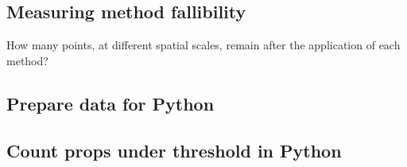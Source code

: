 \documentclass[]{article}
\newenvironment{Shaded}{\begin{snugshade}}{\end{snugshade}}
\newcommand{\CommentTok}[1]{\textcolor[rgb]{0.56,0.35,0.01}{\textit{#1}}}
\newcommand{\DataTypeTok}[1]{\textcolor[rgb]{0.13,0.29,0.53}{#1}}
\newcommand{\DecValTok}[1]{\textcolor[rgb]{0.00,0.00,0.81}{#1}}
\newcommand{\KeywordTok}[1]{\textcolor[rgb]{0.13,0.29,0.53}{\textbf{#1}}}
\newcommand{\NormalTok}[1]{#1}
\newcommand{\OperatorTok}[1]{\textcolor[rgb]{0.81,0.36,0.00}{\textbf{#1}}}
\newcommand{\StringTok}[1]{\textcolor[rgb]{0.31,0.60,0.02}{#1}}
\begin{document}
\hypertarget{measuring-method-fallibility}{%
\subsection{Measuring method fallibility}\label{measuring-method-fallibility}}

How many points, at different spatial scales, remain after the application of each method?

\hypertarget{prepare-data-for-python}{%
\subsection{Prepare data for Python}\label{prepare-data-for-python}}

\begin{Shaded}
\end{Shaded}

\hypertarget{count-props-under-threshold-in-python}{%
\subsection{Count props under threshold in Python}\label{count-props-under-threshold-in-python}}
\end{document}
